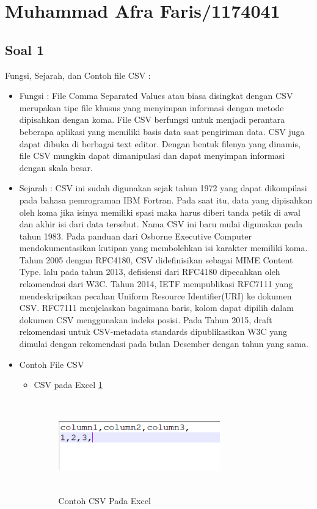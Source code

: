 \section{Muhammad Afra Faris/1174041}
\subsection{Soal 1}
Fungsi, Sejarah, dan Contoh file CSV : 
\begin{itemize}
	\item Fungsi : 
	File Comma Separated Values atau  biasa disingkat dengan CSV merupakan tipe file khusus yang menyimpan informasi dengan metode dipisahkan dengan koma. File CSV berfungsi untuk menjadi perantara beberapa aplikasi yang memiliki basis data saat pengiriman data. CSV juga dapat dibuka di berbagai text editor. Dengan bentuk filenya yang dinamis, file CSV mungkin dapat dimanipulasi dan dapat menyimpan informasi dengan skala besar.
	\item Sejarah :
	CSV ini sudah digunakan sejak tahun 1972 yang dapat dikompilasi pada bahasa pemrograman IBM Fortran. Pada saat itu, data yang dipisahkan oleh koma jika isinya memiliki spasi maka harus diberi tanda petik di awal dan akhir isi dari data tersebut. Nama CSV ini baru mulai digunakan pada tahun 1983. Pada panduan dari Osborne Executive Computer mendokumentasikan kutipan yang membolehkan isi karakter memiliki koma.  Tahun 2005 dengan RFC4180, CSV didefinisikan sebagai MIME Content Type. lalu pada tahun 2013, defisiensi dari RFC4180 dipecahkan oleh rekomendasi dari W3C. Tahun 2014, IETF mempublikasi RFC7111 yang mendeskripsikan pecahan Uniform Resource Identifier(URI) ke dokumen CSV. RFC7111 menjelaskan bagaimana baris, kolom dapat dipilih dalam dokumen CSV menggunakan indeks posisi. Pada Tahun 2015,  draft rekomendasi untuk CSV-metadata standards dipublikasikan W3C yang dimulai dengan rekomendasi pada bulan Desember dengan tahun yang sama. 
	\item Contoh File CSV \begin{itemize}
							\item 
							CSV pada Excel \ref{csvex}
							\begin{figure}[!htbp]
								\centering
								\includegraphics[height=4cm, width=7cm]{figures/4/1174041/Teori/csvex.png}
								\caption{Contoh CSV Pada Excel}
								\label{csvex}
							\end{figure}
														
						  \end{itemize}
\end{itemize}
